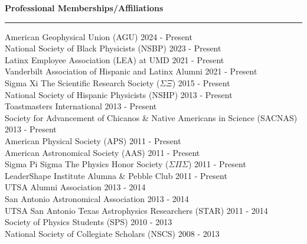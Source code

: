 \documentclass[12pt]{article}
\begin{document}

\newpage
\noindent
{\bf Professional Memberships/Affiliations} \\
\vspace{-10mm}
\begin{center}
\rule{\textwidth}{0.2mm}
\end{center}
\vspace{-3mm}
{ 

\small 
\noindent 
American Geophysical Union (AGU) \hfill 2024 - Present \\
National Society of Black Physicists (NSBP) \hfill 2023 - Present \\
Latinx Employee Association (LEA) at UMD \hfill 2021 - Present \\
Vanderbilt Association of Hispanic and Latinx Alumni \hfill 2021 - Present \\
Sigma Xi \text{\textbar} The Scientific Research Society ($\Sigma \Xi$) \hfill 2015 - Present \\
National Society of Hispanic Physicists (NSHP) \hfill 2013 - Present \\
Toastmasters International \hfill 2013 - Present \\
Society for Advancement of Chicanos \& Native Americans in Science (SACNAS) \hfill 2013 - Present  \\
American Physical Society (APS) \hfill 2011 - Present \\
American Astronomical Society (AAS) \hfill 2011 - Present \\
Sigma Pi Sigma \text{\textbar} The Physics Honor Society ($\Sigma \Pi \Sigma$) \hfill 2011 - Present \\
LeaderShape Institute Alumna \& Pebble Club \hfill 2011 - Present \\
UTSA Alumni Association \hfill 2013 - 2014 \\
San Antonio Astronomical Association \hfill 2013 - 2014 \\
UTSA San Antonio Texas Astrophysics Researchers (STAR) \hfill 2011 - 2014 \\
Society of Physics Students (SPS) \hfill 2010 - 2013 \\
National Society of Collegiate Scholars (NSCS) \hfill 2008 - 2013 \\
}

\end{document}
